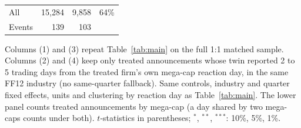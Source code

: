 \begin{table}[htbp]
\begin{tabular}{lrrr}
\midrule
All & 15,284 & 9,858 & 64\% \\
Events & 139 & 103 & \\
\bottomrule
\end{tabular}
\par\medskip
\parbox{0.95\linewidth}{\footnotesize Columns (1) and (3) repeat Table~\ref{tab:main} on the full 1:1 matched sample. Columns (2) and (4) keep only treated announcements whose twin reported 2 to 5 trading days from the treated firm's own mega-cap reaction day, in the same FF12 industry (no same-quarter fallback). Same controls, industry and quarter fixed effects, units and clustering by reaction day as Table~\ref{tab:main}. The lower panel counts treated announcements by mega-cap (a day shared by two mega-caps counts under both). $t$-statistics in parentheses; $^{*}$, $^{**}$, $^{***}$: 10\%, 5\%, 1\%.}
\end{table}
